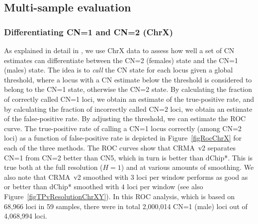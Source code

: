\documentclass{bioinfo}
\newcommand{\TPrate}{true-positive rate\xspace}
\newcommand{\FPrate}{false-positive rate\xspace}
\begin{document}
\subsection{Multi-sample evaluation}

\subsubsection{Differentiating CN=1 and CN=2 (ChrX)}
As explained in detail in \citet{BengtssonH_etal_2008}, we use ChrX data to assess how well a set of CN estimates can differentiate between the CN=2 (females) state and the CN=1 (males) state.  The idea is to \emph{call} the CN state for each locus given a global threshold, where a locus with a CN estimate below the threshold is considered to belong to the CN=1 state, otherwise the CN=2 state. By calculating the fraction of correctly called CN=1 loci, we obtain an estimate of the \TPrate, and by calculating the fraction of incorrectly called CN=2 loci, we obtain an estimate of the \FPrate.  By adjusting the threshold, we can estimate the ROC curve.
The \TPrate of calling a CN=1 locus correctly (among CN=2 loci) as a function of \FPrate is depicted in Figure~\ref{figRocChrX} for each of the three methods.
The ROC curves show that CRMA~v2 separates CN=1 from CN=2 better than CN5, which in turn is better than dChip*.  This is true both at the full resolution ($H=1$) and at various amounts of smoothing.  
We also note that CRMA~v2 smoothed with $3$ loci per window performs as good as or better than dChip* smoothed with $4$ loci per window (see also Figure~\ref{figTPvResolutionChrXY}).
In this ROC analysis, which is based on 68,966 loci in 59 samples, there were in total 2,000,014 CN=1 (male) loci out of 4,068,994 loci.
\end{document}

